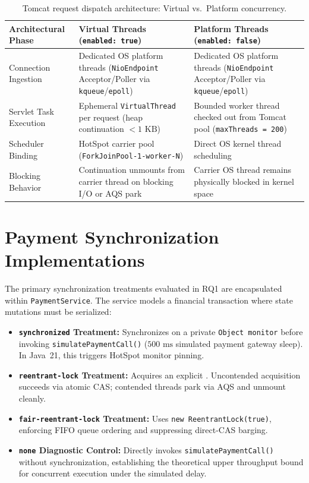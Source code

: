 \begin{table}[htbp]
  \centering
  \caption{Tomcat request dispatch architecture: Virtual vs.\ Platform concurrency.}
  \label{tab:tomcat-dispatch}
  \begin{tabularx}{\textwidth}{@{}>{\raggedright\arraybackslash}p{}>{\raggedright\arraybackslash}p{}>{\raggedright\arraybackslash}X@{}}
    \toprule
    \textbf{Architectural Phase} & \textbf{Virtual Threads (\texttt{enabled: true})} & \textbf{Platform Threads (\texttt{enabled: false})} \\
    \midrule
    Connection Ingestion & Dedicated OS platform threads (\texttt{NioEndpoint} Acceptor/Poller via \texttt{kqueue}/\texttt{epoll}) & Dedicated OS platform threads (\texttt{NioEndpoint} Acceptor/Poller via \texttt{kqueue}/\texttt{epoll}) \\
    \addlinespace
    Servlet Task Execution & Ephemeral \texttt{VirtualThread} per request (heap continuation $< 1\text{ KB}$) & Bounded worker thread checked out from Tomcat pool (\texttt{maxThreads = 200}) \\
    \addlinespace
    Scheduler Binding & HotSpot carrier pool (\texttt{ForkJoinPool-1-worker-N}) & Direct OS kernel thread scheduling \\
    \addlinespace
    Blocking Behavior & Continuation unmounts from carrier thread on blocking I/O or AQS park & Carrier OS thread remains physically blocked in kernel space \\
    \bottomrule
  \end{tabularx}
\end{table}

\section{Payment Synchronization Implementations}
\label{sec:payment-sync-implementations}

The primary synchronization treatments evaluated in RQ1 are encapsulated within \texttt{PaymentService}. The service models a financial transaction where state mutations must be serialized:
\begin{itemize}
  \item \textbf{\texttt{synchronized} Treatment:} Synchronizes on a private \texttt{Object monitor} before invoking \texttt{simulatePaymentCall()} ($500\text{ ms}$ simulated payment gateway sleep). In Java~21, this triggers HotSpot monitor pinning.
  \item \textbf{\texttt{reentrant-lock} Treatment:} Acquires an explicit . Uncontended acquisition succeeds via atomic CAS; contended threads park via AQS and unmount cleanly.
  \item \textbf{\texttt{fair-reentrant-lock} Treatment:} Uses \texttt{new ReentrantLock(true)}, enforcing FIFO queue ordering and suppressing direct-CAS barging.
  \item \textbf{\texttt{none} Diagnostic Control:} Directly invokes \texttt{simulatePaymentCall()} without synchronization, establishing the theoretical upper throughput bound for concurrent execution under the simulated delay.
\end{itemize}


